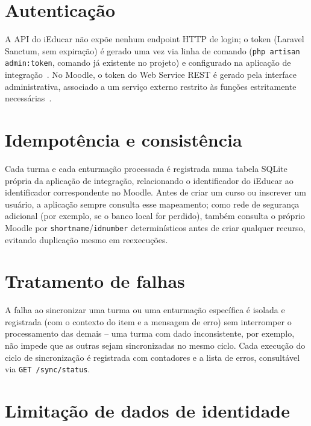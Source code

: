 \documentclass[
	12pt, openright, twoside, a4paper,
	english,
	brazil
	]{abntex2}
\begin{document}
\section{Autentica\c{c}\~ao}

A API do iEducar n\~ao expõe nenhum endpoint HTTP de login; o token (Laravel Sanctum, sem
expira\c{c}\~ao) \'e gerado uma vez via linha de comando
(\texttt{php artisan admin:token}, comando j\'a existente no projeto) e configurado na
aplica\c{c}\~ao de integra\c{c}\~ao~\cite{laravel-sanctum}. No Moodle, o token do Web Service REST
\'e gerado pela interface administrativa, associado a um servi\c{c}o externo restrito \`as
fun\c{c}\~oes estritamente necess\'arias~\cite{moodle-ws-docs}.

\section{Idempot\^encia e consist\^encia}

Cada turma e cada enturma\c{c}\~ao processada \'e registrada numa tabela SQLite pr\'opria da
aplica\c{c}\~ao de integra\c{c}\~ao, relacionando o identificador do iEducar ao identificador
correspondente no Moodle. Antes de criar um curso ou inscrever um usu\'ario, a aplica\c{c}\~ao
sempre consulta esse mapeamento; como rede de seguran\c{c}a adicional (por exemplo, se o banco
local for perdido), tamb\'em consulta o pr\'oprio Moodle por \texttt{shortname}/\texttt{idnumber}
determin\'isticos antes de criar qualquer recurso, evitando duplica\c{c}\~ao mesmo em reexecu\c{c}\~oes.

\section{Tratamento de falhas}

A falha ao sincronizar uma turma ou uma enturma\c{c}\~ao espec\'ifica \'e isolada e registrada
(com o contexto do item e a mensagem de erro) sem interromper o processamento das demais -- uma
turma com dado inconsistente, por exemplo, n\~ao impede que as outras sejam sincronizadas no mesmo
ciclo. Cada execu\c{c}\~ao do ciclo de sincroniza\c{c}\~ao \'e registrada com contadores e a lista
de erros, consult\'avel via \texttt{GET /sync/status}.

\section{Limita\c{c}\~ao de dados de identidade}
\label{sec:limitacao-identidade}
\end{document}
